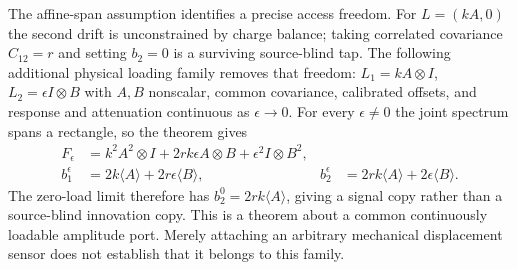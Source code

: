 \documentclass[11pt,oneside,openany]{book}
\theoremstyle{definition}
\theoremstyle{remark}\newtheorem{remark}[theorem]{Remark}
\begin{document}
The affine-span assumption identifies a precise access freedom. For $L=(kA,0)$ the second drift is unconstrained by charge balance; taking correlated covariance $C_{12}=r$ and setting $b_2=0$ is a surviving source-blind tap. The following additional physical loading family removes that freedom:
$L_1=kA\otimes I$, $L_2=\epsilon I\otimes B$ with $A,B$ nonscalar, common covariance, calibrated offsets, and response and attenuation continuous as $\epsilon\to0$. For every $\epsilon\ne0$ the joint spectrum spans a rectangle, so the theorem gives
\begin{align}
 F_\epsilon&=k^2A^2\otimes I+2rk\epsilon A\otimes B+
 \epsilon^2I\otimes B^2,\nonumber\\
 b_1^\epsilon&=2k\langle A\rangle+2r\epsilon\langle B\rangle,
 &b_2^\epsilon&=2rk\langle A\rangle+2\epsilon\langle B\rangle.
 \label{cpc:eq:loadedresponse}
\end{align}
The zero-load limit therefore has $b_2^0=2rk\langle A\rangle$, giving a signal copy rather than a source-blind innovation copy. This is a theorem about a common continuously loadable amplitude port. Merely attaching an arbitrary mechanical displacement sensor does not establish that it belongs to this family.
\end{document}
